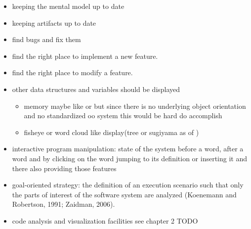 \begin{itemize}
\item keeping the mental model up to date
\item keeping artifacts up to date
\end{itemize}

\begin{itemize}
\item find bugs and fix them
\item find the right place to implement a new feature.
\item find the right place to modify a feature.
\end{itemize}


\begin{itemize}

\item other data structures and variables should be displayed
	\begin{itemize}
	\item memory maybe like \cite{ReissProgrammingEnvironments1995} or \cite{Aftandilian:2010:HIH:1879211.1879222} but since there is no underlying object orientation and no standardized oo system this would be hard do accomplish
	\item fisheye or word cloud like display(tree or sugiyama as of \cite{Storey:1997:IVT:857188.857642})
	\end{itemize}

\item interactive program manipulation: state of the system before a word, after a word and by clicking on the word jumping to its definition or inserting it and there also providing those features

\item goal-oriented strategy: the definition of an execution scenario such that only the parts of interest of the software system are analyzed (Koenemann and Robertson, 1991; Zaidman,
2006).

\item code analysis and visualization facilities see chapter 2 TODO
\end{itemize}
